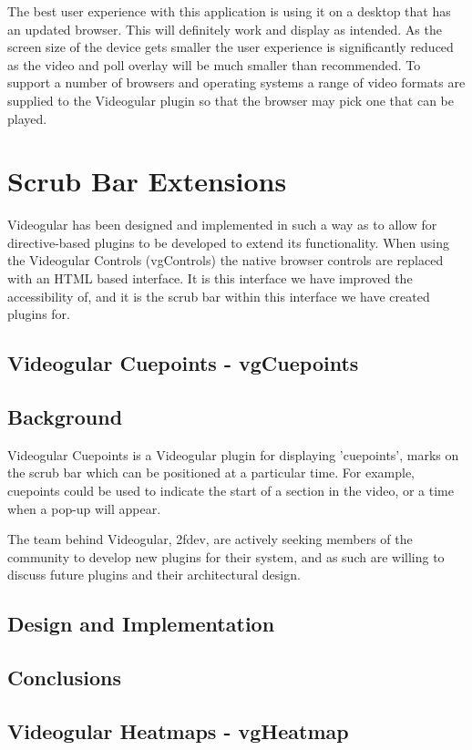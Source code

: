 The best user experience with this application is using it on a desktop that has an updated browser. This will definitely work and display as intended. As the screen size of the device gets smaller the user experience is significantly reduced as the video and poll overlay will be much smaller than recommended. To support a number of browsers and operating systems a range of video formats are supplied to the \gls{Videogular} plugin so that the browser may pick one that can be played.

\section{Scrub Bar Extensions} 
\label{Section:Scrub Bar Extensions}

\gls{Videogular} has been designed and implemented in such a way as to allow for directive-based plugins to be developed to extend its functionality. When using the \gls{Videogular} Controls (vgControls) the native browser controls are replaced with an HTML based interface. It is this interface we have improved the accessibility of, and it is the scrub bar within this interface we have created plugins for.

\subsection{Videogular Cuepoints - vgCuepoints}

\subsection{Background} 
\gls{Videogular} Cuepoints is a \gls{Videogular} plugin for displaying 'cuepoints', marks on the scrub bar which can be positioned at a particular time. For example, cuepoints could be used to indicate the start of a section in the video, or a time when a pop-up will appear.

The team behind \gls{Videogular}, 2fdev, are actively seeking members of the community to develop new plugins for their system, and as such are willing to discuss future plugins and their architectural design.

\subsection{Design and Implementation}

\subsection{Conclusions} 

\subsection{Videogular Heatmaps - vgHeatmap}
